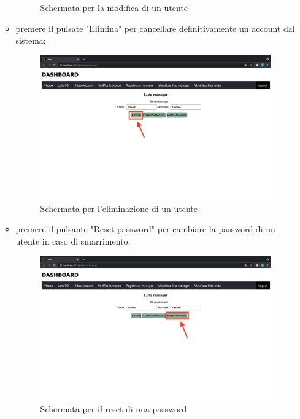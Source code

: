 \begin{itemize}
\begin{itemize}
\begin{figure}[H]
                \caption{Schermata per la modifica di un utente}
            \end{figure}
            \item premere il pulsate "Elimina" per cancellare definitivamente un account dal sistema;
            \begin{figure}[H]
                \centering
                \includegraphics[scale=0.12]{res/images/eliminamanager.png}
                \caption{Schermata per l'eliminazione di un utente}
            \end{figure}
            \item premere il pulsante "Reset password" per cambiare la password di un utente in caso di smarrimento; 
            \begin{figure}[H]
                \centering
                \includegraphics[scale=0.12]{res/images/resetpassword1.png}
                \caption{Schermata per il reset di una password}
            \end{figure}

\end{itemize}
\end{itemize}
